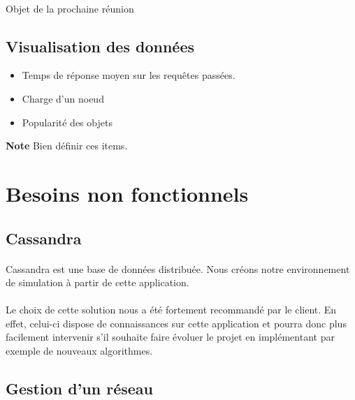 \documentclass[12pt]{article}
\begin{document}
\paragraph{} Objet de la prochaine réunion



\subsection{Visualisation des données}

\begin{itemize}
 \item Temps de réponse moyen sur les requêtes passées.
 \item Charge d'un noeud
 \item Popularité des objets
\end{itemize}


\textbf{Note } Bien définir ces items. \newline


\newpage

\section{Besoins non fonctionnels}

\subsection{Cassandra}

\paragraph{} Cassandra est une base de données distribuée.
Nous créons notre environnement de simulation à partir de cette application.

\paragraph{} Le choix de cette solution nous a été fortement recommandé par le client.
En effet, celui-ci dispose de connaissances sur cette application et pourra donc plus facilement intervenir s'il souhaite faire évoluer le projet en implémentant par exemple de nouveaux algorithmes.

\subsection{Gestion d'un réseau}
\end{document}
